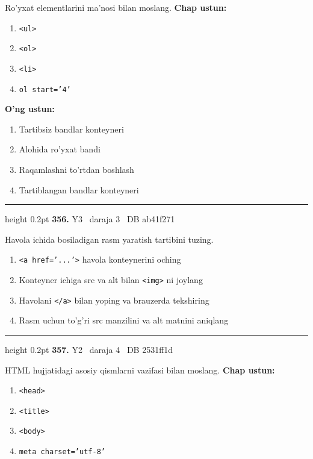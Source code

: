 \documentclass[10pt,a4paper,oneside]{article}
\begin{document}
\par
Ro'yxat elementlarini ma'nosi bilan moslang.
\textbf{\footnotesize Chap ustun:}
\begin{enumerate}[label=\arabic*),leftmargin=9mm]
\item \texttt{\textless{}ul\textgreater{}}
\item \texttt{\textless{}ol\textgreater{}}
\item \texttt{\textless{}li\textgreater{}}
\item \texttt{ol start='4'}
\end{enumerate}
\textbf{\footnotesize O'ng ustun:}
\begin{enumerate}[label=\Alph*),leftmargin=9mm]
\item Tartibsiz bandlar konteyneri
\item Alohida ro'yxat bandi
\item Raqamlashni to'rtdan boshlash
\item Tartiblangan bandlar konteyneri
\end{enumerate}
\vspace{2mm}\hrule height 0.2pt \vspace{4mm}
\hypertarget{q356}{\textbf{\color{ink}356.}}  {\color{muted}\scriptsize Y3 \textbullet\ daraja 3 \textbullet\ DB ab41f271}
\par
Havola ichida bosiladigan rasm yaratish tartibini tuzing.
\begin{enumerate}[label=\Alph*),leftmargin=9mm]
\item \texttt{\textless{}a href='...'\textgreater{}} havola konteynerini oching
\item Konteyner ichiga src va alt bilan \texttt{\textless{}img\textgreater{}} ni joylang
\item Havolani \texttt{\textless{}/a\textgreater{}} bilan yoping va brauzerda tekshiring
\item Rasm uchun to'g'ri src manzilini va alt matnini aniqlang
\end{enumerate}
\vspace{2mm}\hrule height 0.2pt \vspace{4mm}
\hypertarget{q357}{\textbf{\color{ink}357.}}  {\color{muted}\scriptsize Y2 \textbullet\ daraja 4 \textbullet\ DB 2531ff1d}
\par
HTML hujjatidagi asosiy qismlarni vazifasi bilan moslang.
\textbf{\footnotesize Chap ustun:}
\begin{enumerate}[label=\arabic*),leftmargin=9mm]
\item \texttt{\textless{}head\textgreater{}}
\item \texttt{\textless{}title\textgreater{}}
\item \texttt{\textless{}body\textgreater{}}
\item \texttt{meta charset='utf-8'}
\end{enumerate}
\end{document}
